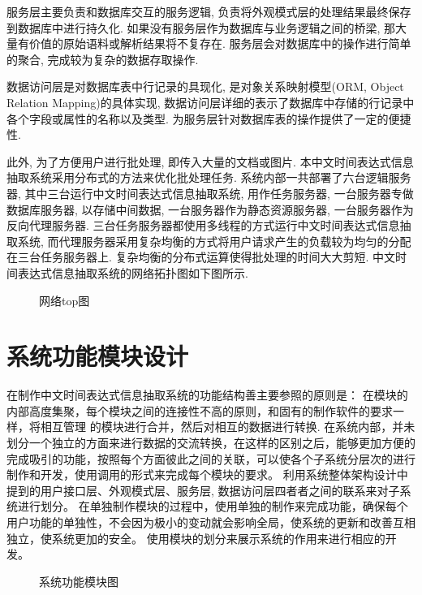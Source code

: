 服务层主要负责和数据库交互的服务逻辑, 负责将外观模式层的处理结果最终保存到数据库中进行持久化.
如果没有服务层作为数据库与业务逻辑之间的桥梁, 那大量有价值的原始语料或解析结果将不复存在.
服务层会对数据库中的操作进行简单的聚合, 完成较为复杂的数据存取操作.

数据访问层是对数据库表中行记录的具现化, 是对象关系映射模型(ORM, Object Relation Mapping)的具体实现, 数据访问层详细的表示了数据库中存储的行记录中各个字段或属性的名称以及类型.
为服务层针对数据库表的操作提供了一定的便捷性.

此外, 为了方便用户进行批处理, 即传入大量的文档或图片. 本中文时间表达式信息抽取系统采用分布式的方法来优化批处理任务.
系统内部一共部署了六台逻辑服务器, 其中三台运行中文时间表达式信息抽取系统, 用作任务服务器, 一台服务器专做数据库服务器, 以存储中间数据, 一台服务器作为静态资源服务器, 一台服务器作为反向代理服务器.
三台任务服务器都使用多线程的方式运行中文时间表达式信息抽取系统, 而代理服务器采用复杂均衡的方式将用户请求产生的负载较为均匀的分配在三台任务服务器上. 复杂均衡的分布式运算使得批处理的时间大大剪短.
中文时间表达式信息抽取系统的网络拓扑图如下图所示.

\begin{figure}[h]
  \centering
  \caption{网络top图}
  \label{fig:network_top}
\end{figure}

\section{系统功能模块设计}

在制作中文时间表达式信息抽取系统的功能结构善主要参照的原则是：
在模块的内部高度集聚，每个模块之间的连接性不高的原则，和固有的制作软件的要求一样，将相互管理
的模块进行合并，然后对相互的数据进行转换.
在系统内部，并未划分一个独立的方面来进行数据的交流转换，在这样的区别之后，能够更加方便的完成吸引的功能，按照每个方面彼此之间的关联，可以使各个子系统分层次的进行制作和开发，使用调用的形式来完成每个模块的要求。
利用系统整体架构设计中提到的用户接口层、外观模式层、服务层, 数据访问层四者者之间的联系来对子系统进行划分。
在单独制作模块的过程中，使用单独的制作来完成功能，确保每个用户功能的单独性，不会因为极小的变动就会影响全局，使系统的更新和改善互相独立，使系统更加的安全。
使用模块的划分来展示系统的作用来进行相应的开发。

\begin{figure}[h]
  \centering
  \caption{系统功能模块图}
  \label{fig:system_feature}
\end{figure}

